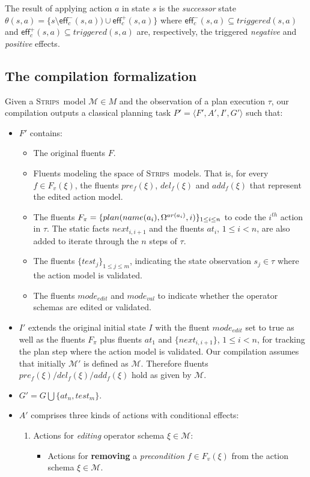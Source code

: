 \documentclass[letterpaper]{article} %
\newcommand{\tup}[1]{{\langle #1 \rangle}}
\newcommand{\eff}{\mathsf{eff}}     %
\newcommand{\strips}{\textsc{Strips}}     %
\begin{document}
The result of applying action $a$ in state $s$ is the {\em successor} state $\theta(s,a)=\{s\setminus\eff_c^-(s,a))\cup\eff_c^+(s,a)\}$ where $\eff_c^-(s,a)\subseteq triggered(s,a)$ and $\eff_c^+(s,a)\subseteq triggered(s,a)$ are, respectively, the triggered {\em negative} and {\em positive} effects.


\subsection{The compilation formalization}
Given a \strips\ model $\mathcal{M}\in M$ and the observation of a plan execution $\tau$, our compilation outputs a classical planning task $P'=\tup{F',A',I',G'}$ such that:
\begin{itemize}
\item $F'$ contains:
\begin{itemize}
\item The original fluents $F$. 
\item Fluents modeling the space of \strips\ models. That is, for every $f\in F_v(\xi)$, the fluents $pre_f(\xi)$, $del_f(\xi)$ and $add_f(\xi)$ that represent the edited action model.
\item The fluents $F_{\pi}=\{plan(name(a_i),\Omega^{ar(a_i)},i)\}_{\small 1\leq i\leq n}$ to code the $i^{th}$ action in $\tau$. The static facts $next_{i,i+1}$ and the fluents $at_i$, {\small $1\leq i< n$}, are also added to iterate through the $n$ steps of $\tau$.
\item The fluents $\{test_j\}_{1\leq j\leq m}$, indicating the state observation $s_j\in\tau$ where the action model is validated.
\item The fluents $mode_{edit}$ and $mode_{val}$ to indicate whether the operator schemas are edited or validated.
\end{itemize}
\item $I'$ extends the original initial state $I$ with the fluent $mode_{edit}$ set to true as well as the fluents $F_{\pi}$ plus fluents $at_1$ and $\{next_{i,i+1}\}$, {\small $1\leq i<n$}, for tracking the plan step where the action model is validated. Our compilation assumes that initially $\mathcal{M}'$ is defined as $\mathcal{M}$. Therefore fluents $pre_f(\xi)/del_f(\xi)/add_f(\xi)$ hold as given by $\mathcal{M}$.

\item $G'=G\bigcup\{at_n,test_m\}$.
\item $A'$ comprises three kinds of actions with conditional effects:
\begin{enumerate}
\item Actions for {\em editing} operator schema $\xi\in\mathcal{M}$:
\begin{itemize}
\item Actions for {\bf removing} a {\em precondition} $f\in F_v(\xi)$ from the action schema $\xi\in\mathcal{M}$.


\end{itemize}
\end{enumerate}
\end{itemize}
\end{document}
